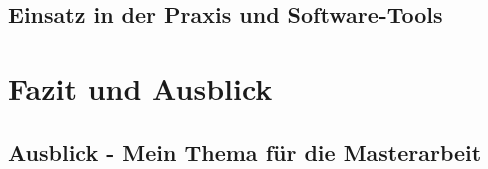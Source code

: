 \documentclass[11pt,fleqn]{book}
\begin{document}
\section{Einsatz in der Praxis und Software-Tools}




\chapter{Fazit und Ausblick}
\section{Ausblick - Mein Thema für die Masterarbeit}


\printbibliography
\vfill
\end{document}
